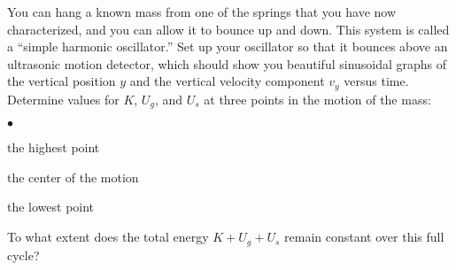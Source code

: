 \documentclass[12pt]{article}
\newcommand{\squishlist}{
   \begin{list}{$\bullet$}
    { \setlength{\itemsep}{0pt}      \setlength{\parsep}{3pt}
      \setlength{\topsep}{3pt}       \setlength{\partopsep}{0pt}
      \setlength{\leftmargin}{1.5em} \setlength{\labelwidth}{1em}
      \setlength{\labelsep}{0.5em} } }
\newcommand{\squishend}{
    \end{list}  }
\begin{document}
You can hang a known mass from one of the springs that you have now 
characterized, and you can allow it to bounce up and down.  This system
is called a ``simple harmonic oscillator.''  Set up your oscillator so that 
it bounces above an ultrasonic motion detector, which should show
you beautiful sinusoidal graphs of the vertical position $y$ and the
vertical velocity component $v_y$ versus time.
Determine values for $K$, $U_g$, and $U_s$ at three points in the motion of 
the mass:
\squishlist
\item the highest point
\item the center of the motion
\item the lowest point
\squishend
To what extent does the total energy $K + U_g + U_s$ remain constant
over this full cycle?
\end{document}
